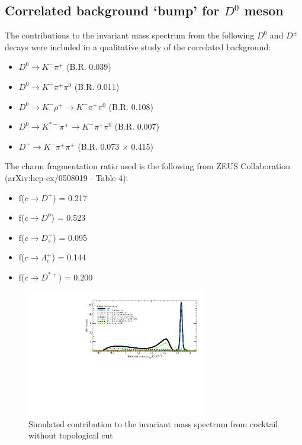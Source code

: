 \subsection{Correlated background `bump' for $D^0$ meson}

The contributions to the invariant mass spectrum from the following $D^0$ and $D^\pm$ decays were included in a qualitative study of the correlated background: 

\begin{itemize}
\item $D^0 \rightarrow K^-\pi^+$ (B.R. 0.039)
\item $D^0 \rightarrow  K^-\pi^+\pi^0$ (B.R. 0.011)
\item $D^0 \rightarrow  K^-\rho^+ \rightarrow K^-\pi^+\pi^0$ (B.R. 0.108)
\item $D^0 \rightarrow  K^{*-}\pi^+\rightarrow K^-\pi^+\pi^0$ (B.R. 0.007)
\item $D^+ \rightarrow  K^-\pi^+\pi^+$ (B.R. 0.073 $\times$ 0.415)
\end{itemize}

The charm fragmentation ratio used is the following from ZEUS Collaboration (arXiv:hep-ex/0508019 - Table 4):

\begin{itemize}
\item f($c \rightarrow D^+$) = 0.217 
\item f($c \rightarrow D^0$) = 0.523 
\item f($c \rightarrow D^+_s$) = 0.095
\item f($c \rightarrow \Lambda^+_c$) = 0.144
\item f($c \rightarrow D^{*+}$) = 0.200
\end{itemize}

\begin{figure}[htbp]
\centering
\includegraphics[keepaspectratio,width=0.7\textwidth,angle=0]{figure/Run14_D0HFT/D0Bump_without_topo.pdf}
\caption{Simulated contribution to the invariant mass spectrum from cocktail without topological cut}
\label{fig:cocktail1}
\end{figure}

